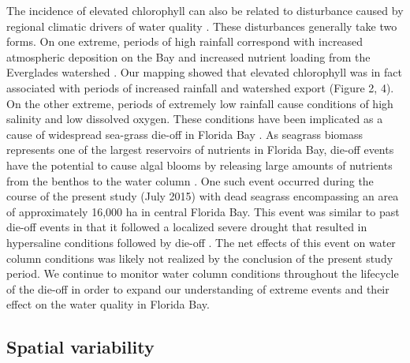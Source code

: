 The incidence of elevated chlorophyll can also be related to disturbance caused by regional climatic drivers of water quality \citep{davis2004importance, briceno_climatic_2009}. These disturbances generally take two forms. On one extreme, periods of high rainfall correspond with increased atmospheric deposition on the Bay and increased nutrient loading from the Everglades watershed \citep{rudnick1999phosphorus,sutula2003factors}. Our mapping showed that elevated chlorophyll was in fact associated with periods of increased rainfall and watershed export (Figure 2, 4).  On the other extreme, periods of extremely low rainfall cause conditions of high salinity and low dissolved oxygen. These conditions have been implicated as a cause of widespread sea-grass die-off in Florida Bay \citep{borum2005potential, zieman1999seagrass}. As seagrass biomass represents one of the largest reservoirs of nutrients in Florida Bay, die-off events have the potential to cause algal blooms by releasing large amounts of nutrients from the benthos to the water column \citep{fourqurean2012carbon, zhang2004potential}. One such event occurred during the course of the present study (July 2015) with dead seagrass encompassing an area of approximately 16,000 ha in central Florida Bay. This event was similar to past die-off events in that it followed a localized severe drought that resulted in hypersaline conditions followed by die-off \citep{robblee1991mass}. The net effects of this event on water column conditions was likely not realized by the conclusion of the present study period. We continue to monitor water column conditions throughout the lifecycle of the die-off in order to expand our understanding of extreme events and their effect on the water quality in Florida Bay.

\subsection{Spatial variability}
\label{spatialvariability}

